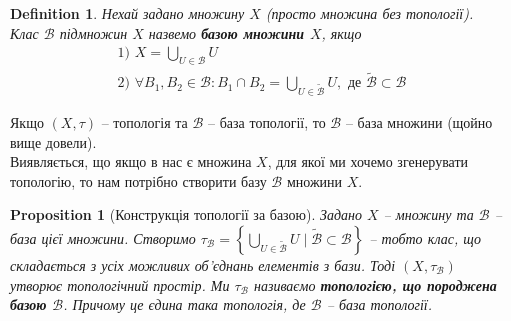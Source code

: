 \documentclass[a4paper, 10pt]{article}
\theoremstyle{theoremdd}
\newtheorem{definition}[theorem]{Definition}
\newtheorem{proposition}[theorem]{Proposition}
\begin{document}
\begin{definition}
Нехай задано множину $X$ (просто множина без топології).\\
Клас $\mathcal{B}$ підмножин $X$ назвемо \textbf{базою множини $X$}, якщо
\begin{align*}
\text{1) } X = \bigcup_{U \in \mathcal{B}} U \\
\text{2) } \forall B_1,B_2 \in \mathcal{B}: B_1 \cap B_2 = \bigcup_{U \in \mathcal{\tilde{B}}} U, \text{ де } \mathcal{\tilde{B}} \subset \mathcal{B}
\end{align*} 
\end{definition}
\noindent
Якщо $(X,\tau)$ -- топологія та $\mathcal{B}$ -- база топології, то $\mathcal{B}$ -- база множини (щойно вище довели).\\
Виявляється, що якщо в нас є множина $X$, для якої ми хочемо згенерувати топологію, то нам потрібно створити базу $\mathcal{B}$ множини $X$.

\begin{proposition}[Конструкція топології за базою]
Задано $X$ -- множину та $\mathcal{B}$ -- база цієї множини. Створимо $\tau_{\mathcal{B}} = \left\{ \displaystyle\bigcup_{U \in \mathcal{\mathcal{\tilde{B}}}} U \mid \mathcal{\tilde{B}} \subset \mathcal{B} \right\}$ -- тобто клас, що складається з усіх можливих об'єднань елементів з бази. Тоді $(X,\tau_{\mathcal{B}})$ утворює топологічний простір. Ми $\tau_{\mathcal{B}}$ називаємо \textbf{топологією, що породжена базою $\mathcal{B}$}. Причому це єдина така топологія, де $\mathcal{B}$ -- база топології.
\end{proposition}
\end{document}
